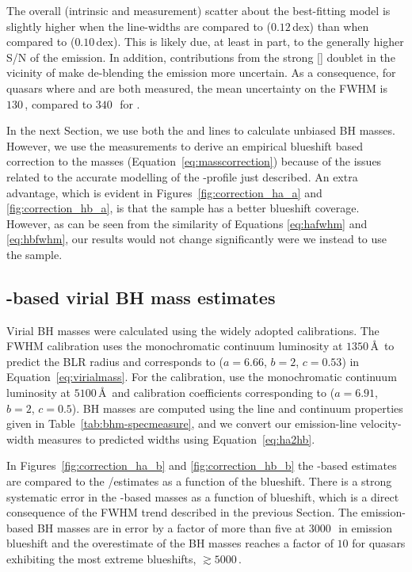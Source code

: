 The overall (intrinsic and measurement) scatter about the best-fitting model is slightly higher when the  line-widths are compared to \hb ($0.12$\,dex) than when compared to \ha ($0.10$\,dex). 
This is likely due, at least in part, to the generally higher S/N of the \ha emission. 
In addition, contributions from the strong [] doublet in the vicinity of \hb make de-blending the \hb emission more uncertain. 
As a consequence, for quasars where \ha and \hb are both measured, the mean uncertainty on the \ha FWHM is $130$\,\kms, compared to $340$\,\kms\, for \hbns. 

In the next Section, we use both the \ha and \hb lines to calculate unbiased BH masses. 
However, we use the \ha measurements to derive an empirical  blueshift based correction to the  masses (Equation~\ref{eq:masscorrection}) because of the issues related to the accurate modelling of the \hbns-profile just described.  
An extra advantage, which is evident in Figures~\ref{fig:correction_ha_a} and \ref{fig:correction_hb_a}, is that the \ha sample has a better  blueshift coverage. 
However, as can be seen from the similarity of Equations \ref{eq:hafwhm} and \ref{eq:hbfwhm}, our results would not change significantly were we instead to use the \hb sample. 

\subsection{-based virial BH mass estimates}

Virial BH masses were calculated using the widely adopted \citet{vestergaard06} calibrations. 
The \citet{vestergaard06}  FWHM calibration uses the monochromatic continuum luminosity at $1350$\,\AA\, to predict the BLR radius and corresponds to ($a=6.66$, $b=2$, $c=0.53$) in Equation~\ref{eq:virialmass}. 
For the \hb calibration, \citet{vestergaard06} use the monochromatic continuum luminosity at $5100$\,\AA\, and calibration coefficients corresponding to ($a=6.91$, $b=2$, $c=0.5$).
BH masses are computed using the line and continuum properties given in Table~\ref{tab:bhm-specmeasure}, and we convert our \ha emission-line velocity-width measures to predicted \hb widths using Equation~\ref{eq:ha2hb}.

In Figures~\ref{fig:correction_ha_b} and \ref{fig:correction_hb_b} the -based estimates are compared to the \hans/\hb estimates as a function of the  blueshift. 
There is a strong systematic error in the -based masses as a function of blueshift, which is a direct consequence of the FWHM trend described in the previous Section. 
The  emission-based BH masses are in error by a factor of more than five at $3000$\,\kms\, in  emission blueshift and the overestimate of the BH masses reaches a factor of $10$ for quasars exhibiting the most extreme blueshifts, $\gtrsim5000$\,\kms. 

